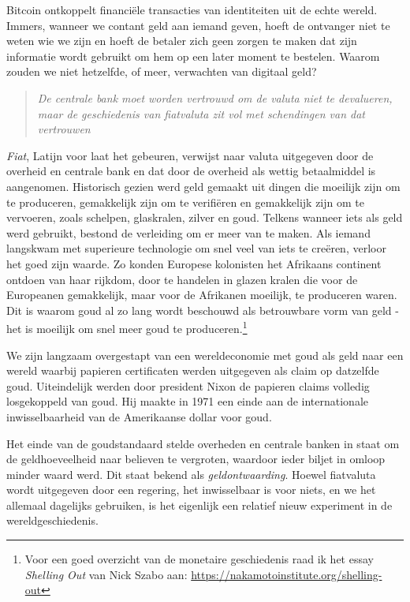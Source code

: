 \documentclass[smalldemyvopaper,11pt,twoside,onecolumn,openright,extrafontsizes]{memoir}
\begin{document}
Bitcoin ontkoppelt financiële transacties van identiteiten uit de echte wereld. Immers, wanneer we contant geld aan iemand geven, hoeft de ontvanger niet te weten wie we zijn en hoeft de betaler zich geen zorgen te maken dat zijn informatie wordt gebruikt om hem op een later moment te bestelen. Waarom zouden we niet hetzelfde, of meer, verwachten van digitaal geld?

\begin{quote}
\textit{De centrale bank moet worden vertrouwd om de valuta niet te devalueren, maar de geschiedenis van fiatvaluta zit vol met schendingen van dat vertrouwen}
\end{quote}

\textit{Fiat}, Latijn voor \textquotedbl{}laat het gebeuren\textquotedbl{}, verwijst naar valuta uitgegeven door de overheid en centrale bank en dat door de overheid als wettig betaalmiddel is aangenomen. Historisch gezien werd geld gemaakt uit dingen die moeilijk zijn om te produceren, gemakkelijk zijn om te verifiëren en gemakkelijk zijn om te vervoeren, zoals schelpen, glaskralen, zilver en goud. Telkens wanneer iets als geld werd gebruikt, bestond de verleiding om er meer van te maken. Als iemand langskwam met superieure technologie om snel veel van iets te creëren, verloor het goed zijn waarde. Zo konden Europese kolonisten het Afrikaans continent ontdoen van haar rijkdom, door te handelen in glazen kralen die voor de Europeanen gemakkelijk, maar voor de Afrikanen moeilijk, te produceren waren. Dit is waarom goud al zo lang wordt beschouwd als betrouwbare vorm van geld - het is moeilijk om snel meer goud te produceren.\footnote{Voor een goed overzicht van de monetaire geschiedenis raad ik het essay \textit{Shelling Out} van Nick Szabo aan: \href{https://nakamotoinstitute.org/shelling-out}{https://nakamotoinstitute.org/shelling-out}}

We zijn langzaam overgestapt van een wereldeconomie met goud als geld naar een wereld waarbij papieren certificaten werden uitgegeven als claim op datzelfde goud. Uiteindelijk werden door president Nixon de papieren claims volledig losgekoppeld van goud. Hij maakte in 1971 een einde aan de internationale inwisselbaarheid van de Amerikaanse dollar voor goud.

Het einde van de goudstandaard stelde overheden en centrale banken in staat om de geldhoeveelheid naar believen te vergroten, waardoor ieder biljet in omloop minder waard werd. Dit staat bekend als \textit{geldontwaarding}. Hoewel fiatvaluta wordt uitgegeven door een regering, het inwisselbaar is voor niets, en we het allemaal dagelijks gebruiken, is het eigenlijk een relatief nieuw experiment in de wereldgeschiedenis.
\end{document}
